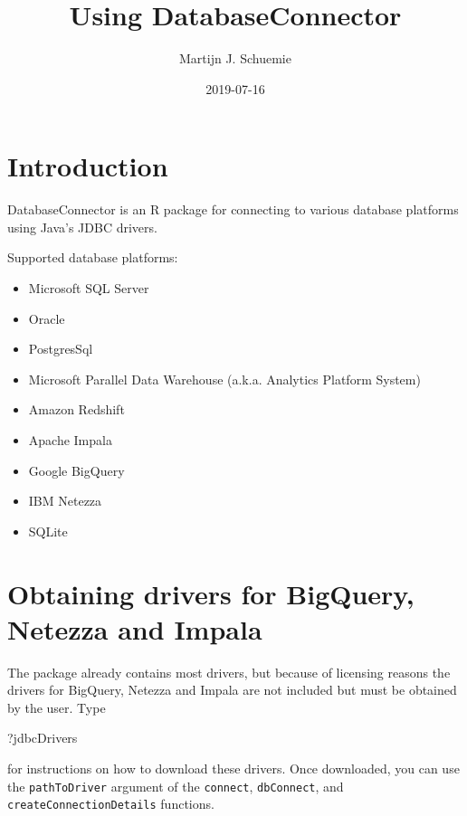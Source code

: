 \documentclass[]{article}
\title{Using DatabaseConnector}
\author{Martijn J. Schuemie}
\date{2019-07-16}
\newenvironment{Shaded}{\begin{snugshade}}{\end{snugshade}}
\newcommand{\NormalTok}[1]{#1}
\providecommand{\tightlist}{%
  \setlength{\itemsep}{0pt}\setlength{\parskip}{0pt}}
\begin{document}
\maketitle

{
\setcounter{tocdepth}{2}
\tableofcontents
}
\hypertarget{introduction}{%
\section{Introduction}\label{introduction}}

DatabaseConnector is an R package for connecting to various database
platforms using Java's JDBC drivers.

Supported database platforms:

\begin{itemize}
\tightlist
\item
  Microsoft SQL Server
\item
  Oracle
\item
  PostgresSql
\item
  Microsoft Parallel Data Warehouse (a.k.a. Analytics Platform System)
\item
  Amazon Redshift
\item
  Apache Impala
\item
  Google BigQuery
\item
  IBM Netezza
\item
  SQLite
\end{itemize}

\hypertarget{obtaining-drivers-for-bigquery-netezza-and-impala}{%
\section{Obtaining drivers for BigQuery, Netezza and
Impala}\label{obtaining-drivers-for-bigquery-netezza-and-impala}}

The package already contains most drivers, but because of licensing
reasons the drivers for BigQuery, Netezza and Impala are not included
but must be obtained by the user. Type

\begin{Shaded}
\begin{Highlighting}[]
\NormalTok{?jdbcDrivers}
\end{Highlighting}
\end{Shaded}

for instructions on how to download these drivers. Once downloaded, you
can use the \texttt{pathToDriver} argument of the \texttt{connect},
\texttt{dbConnect}, and \texttt{createConnectionDetails} functions.
\end{document}
